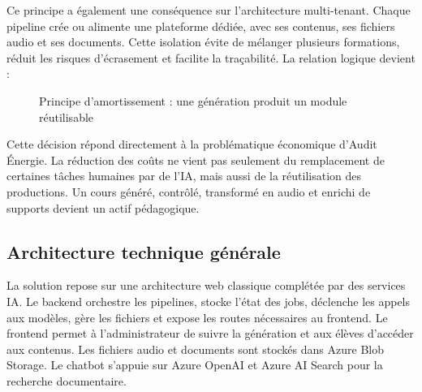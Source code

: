 \documentclass[12pt,a4paper]{article}
\begin{document}
Ce principe a également une conséquence sur l'architecture multi-tenant. Chaque pipeline
crée ou alimente une plateforme dédiée, avec ses contenus, ses fichiers audio et ses
documents. Cette isolation évite de mélanger plusieurs formations, réduit les risques
d'écrasement et facilite la traçabilité. La relation logique devient :

\begin{figure}[h]
\centering
{}
\caption{Principe d'amortissement : une génération produit un module réutilisable}
\end{figure}

Cette décision répond directement à la problématique économique d'Audit Énergie. La
réduction des coûts ne vient pas seulement du remplacement de certaines tâches humaines
par de l'IA, mais aussi de la réutilisation des productions. Un cours généré, contrôlé,
transformé en audio et enrichi de supports devient un actif pédagogique.

\subsection{Architecture technique générale}

La solution repose sur une architecture web classique complétée par des services IA. Le
backend orchestre les pipelines, stocke l'état des jobs, déclenche les appels aux modèles,
gère les fichiers et expose les routes nécessaires au frontend. Le frontend permet à
l'administrateur de suivre la génération et aux élèves d'accéder aux contenus. Les fichiers
audio et documents sont stockés dans Azure Blob Storage. Le chatbot s'appuie sur Azure
OpenAI et Azure AI Search pour la recherche documentaire.
\end{document}
